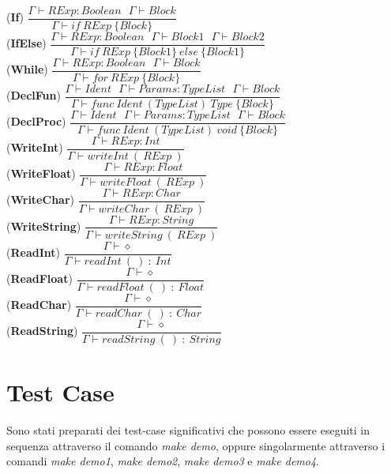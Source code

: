 \documentclass[12pt]{article}
\begin{document}
\begin{center}
\noindent(\textbf{If})
$\dfrac{\Gamma \vdash RExp:Boolean\ \ \ \Gamma \vdash Block}{\Gamma \vdash if\ RExp\ \{ Block\}}$\\[0.1in]
\noindent(\textbf{IfElse})
$\dfrac{\Gamma \vdash RExp:Boolean\ \ \ \Gamma \vdash Block1\ \ \ \Gamma \vdash Block2}{\Gamma \vdash if\ RExp\ \{ Block1\}\ else\ \{ Block1\}}$\\[0.1in]
\noindent(\textbf{While})
$\dfrac{\Gamma \vdash RExp:Boolean\ \ \ \Gamma \vdash Block}{\Gamma \vdash for\ RExp\ \{ Block\}}$\\[0.1in]

\noindent(\textbf{DeclFun})
$\dfrac{\Gamma \vdash Ident\ \ \ \Gamma \vdash Params:TypeList\ \ \ \Gamma \vdash Block}{\Gamma \vdash func\ Ident\ (TypeList)\ Type\ \{Block\}}$\\[0.1in]
\noindent(\textbf{DeclProc})
$\dfrac{\Gamma \vdash Ident\ \ \ \Gamma \vdash Params:TypeList\ \ \ \Gamma \vdash Block}{\Gamma \vdash func\ Ident\ (TypeList)\ void\ \{Block\}}$\\[0.1in]

\noindent(\textbf{WriteInt})
$\dfrac{\Gamma \vdash RExp:Int}{\Gamma \vdash writeInt\ (\ RExp\ )}$\\[0.1in]
\noindent(\textbf{WriteFloat})
$\dfrac{\Gamma \vdash RExp:Float}{\Gamma \vdash writeFloat\ (\ RExp\ )}$\\[0.1in]
\noindent(\textbf{WriteChar})
$\dfrac{\Gamma \vdash RExp:Char}{\Gamma \vdash writeChar\ (\ RExp\ )}$\\[0.1in]
\noindent(\textbf{WriteString})
$\dfrac{\Gamma \vdash RExp:String}{\Gamma \vdash writeString\ (\ RExp\ )}$\\[0.1in]
\noindent(\textbf{ReadInt})
$\dfrac{\Gamma \vdash \diamond}{\Gamma \vdash readInt\ (\ )\ :\ Int}$\\[0.1in]
\noindent(\textbf{ReadFloat})
$\dfrac{\Gamma \vdash \diamond}{\Gamma \vdash readFloat\ (\ )\ :\ Float}$\\[0.1in]
\noindent(\textbf{ReadChar})
$\dfrac{\Gamma \vdash \diamond}{\Gamma \vdash readChar\ (\ )\ :\ Char}$\\[0.1in]
\noindent(\textbf{ReadString})
$\dfrac{\Gamma \vdash \diamond}{\Gamma \vdash readString\ (\ )\ :\ String}$\\[0.1in]
\end{center}





\pagebreak
\section{Test Case}
Sono stati preparati dei test-case significativi che possono essere eseguiti in sequenza attraverso il comando \textit{make demo}, oppure singolarmente attraverso i comandi \textit{make demo1}, \textit{make demo2}, \textit{make demo3} e \textit{make demo4}.
\end{document}

